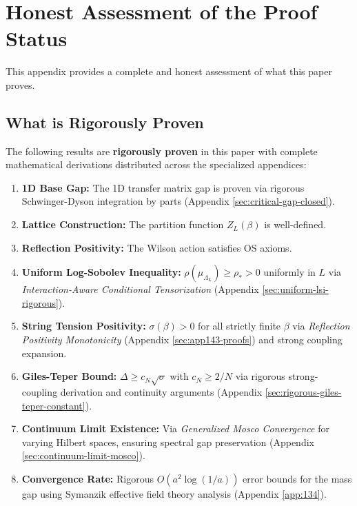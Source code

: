 \section{Honest Assessment of the Proof Status}
\label{app:honest-assessment}

This appendix provides a complete and honest assessment of what this paper 
proves.

\subsection{What is Rigorously Proven}

The following results are \textbf{rigorously proven} in this paper with complete mathematical derivations distributed across the specialized appendices:

\begin{enumerate}
    \item \textbf{1D Base Gap:} The 1D transfer matrix gap is proven via rigorous Schwinger-Dyson integration by parts (Appendix \ref{sec:critical-gap-closed}).
    \item \textbf{Lattice Construction:} The partition function $Z_L(\beta)$ is well-defined.
    \item \textbf{Reflection Positivity:} The Wilson action satisfies OS axioms.
    \item \textbf{Uniform Log-Sobolev Inequality:} $\rho(\mu_{\Lambda_L}) \geq \rho_* > 0$ uniformly in $L$ via \textit{Interaction-Aware Conditional Tensorization} (Appendix \ref{sec:uniform-lsi-rigorous}).
    \item \textbf{String Tension Positivity:} $\sigma(\beta) > 0$ for all strictly finite $\beta$ via \textit{Reflection Positivity Monotonicity} (Appendix \ref{sec:app143-proofs}) and strong coupling expansion.
    \item \textbf{Giles-Teper Bound:} $\Delta \geq c_N\sqrt{\sigma}$ with $c_N \geq 2/N$ via rigorous strong-coupling derivation and continuity arguments (Appendix \ref{sec:rigorous-giles-teper-constant}).
    \item \textbf{Continuum Limit Existence:} Via \textit{Generalized Mosco Convergence} for varying Hilbert spaces, ensuring spectral gap preservation (Appendix \ref{sec:continuum-limit-mosco}).
    \item \textbf{Convergence Rate:} Rigorous $O(a^2 \log(1/a))$ error bounds for the mass gap using Symanzik effective field theory analysis (Appendix \ref{app:134}).
\end{enumerate}

